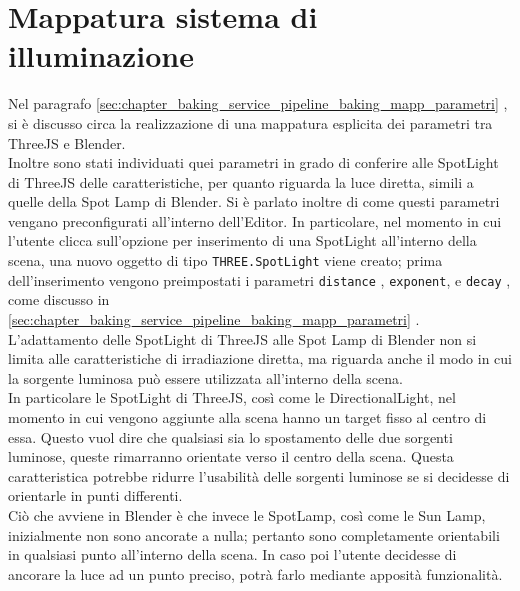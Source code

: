 \section{Mappatura sistema di illuminazione}
\label{sec:chapter_creazione_scena_mapping_illuminazione}
Nel paragrafo \ref{sec:chapter_baking_service_pipeline_baking_mapp_parametri} , si è discusso circa la realizzazione di una mappatura esplicita dei parametri tra ThreeJS e Blender. 
\\
Inoltre sono stati individuati quei parametri in grado di conferire alle SpotLight di ThreeJS delle caratteristiche, per quanto riguarda la luce diretta, simili a quelle della Spot Lamp di Blender. Si è parlato inoltre di come questi parametri vengano preconfigurati all’interno dell’Editor. In particolare, nel momento in cui l’utente clicca sull’opzione per inserimento di una SpotLight all’interno della scena, una nuovo oggetto di tipo \texttt{THREE.SpotLight} viene creato; prima dell’inserimento vengono preimpostati i parametri \texttt{distance} , \texttt{exponent}, e \texttt{decay} , come discusso in \ref{sec:chapter_baking_service_pipeline_baking_mapp_parametri} .
\\ 
L’adattamento delle SpotLight di ThreeJS alle Spot Lamp di Blender non si limita alle caratteristiche di irradiazione diretta, ma riguarda anche il modo in cui la sorgente luminosa può essere utilizzata all’interno della scena. 
\\
In particolare le SpotLight di ThreeJS, così come le DirectionalLight, nel momento in cui vengono aggiunte alla scena hanno un target fisso al centro di essa. Questo vuol dire che qualsiasi sia lo spostamento delle due sorgenti luminose, queste rimarranno orientate verso il centro della scena. Questa caratteristica potrebbe ridurre l’usabilità delle sorgenti luminose se si decidesse di orientarle in punti differenti.
\\ 
Ciò che avviene in Blender è che invece le SpotLamp, così come le Sun Lamp, inizialmente non sono ancorate a nulla; pertanto sono completamente orientabili in qualsiasi punto all’interno della scena. In caso poi l’utente decidesse di ancorare la luce ad un punto preciso, potrà farlo mediante apposità funzionalità.
\\
